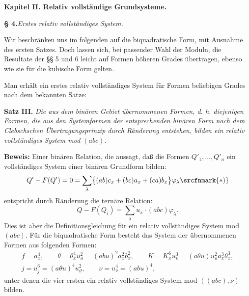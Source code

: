 \begin{center}
\textbf{Kapitel II. \quad Relativ vollständige Grundsysteme.}

\textbf{§ 4.}\quad\emph{Erstes relativ vollständiges System.}
\end{center}

Wir beschränken uns im folgenden auf die biquadratische Form, mit Ausnahme des ersten Satzes. Doch lassen sich, bei passender Wahl der Moduln, die Resultate der §§ 5 und 6 leicht auf Formen höheren Grades übertragen, ebenso wie sie für die kubische Form gelten.

Man erhält ein erstes relativ vollständiges System für Formen beliebigen Grades nach dem bekannten Satze:

\clearpage
\noindent\textbf{Satz III.}
\emph{Die aus dem binären Gebiet übernommenen Formen, d. h. diejenigen Formen, die aus den Systemformen der entsprechenden binären Form nach dem Clebschschen Übertragungsprinzip durch Ränderung entstehen, bilden ein relativ vollständiges System mod $(abc)$.}

\noindent\textbf{Beweis:}
Einer binären Relation, die aussagt, daß die Formen $Q'_1,\ldots,Q'_n$ ein vollständiges System einer binären Grundform bilden:
\[
Q'-F(Q')=0=\sum_\lambda\bigl\{(ab)c_x+(bc)a_x+(ca)b_x\bigr\}\varphi_\lambda\srcfnmark{*)}
\]
entspricht durch Ränderung die ternäre Relation:
\[
Q-F(Q_i)=\sum_\lambda u_x\cdot(abc)\varphi_\lambda .
\]
Dies ist aber die Definitionsgleichung für ein relativ vollständiges System mod $(abc)$. Für die biquadratische Form besteht das System der übernommenen Formen aus folgenden Formen:
\[
\begin{gathered}
f=a_x^4,\qquad
\theta=\theta_x^4u_\vartheta^2=(abu)^2a_x^2b_x^2,
\qquad
K=K_x^6u_k^3=(a\theta u)u_\vartheta^2a_x^3\theta_x^3,\\
j=u_j^6=(a\theta u)^4u_\vartheta^2,\qquad
\nu=u_\nu^4=(abu)^4,
\end{gathered}
\]
unter denen die vier ersten ein relativ vollständiges System mod $((abc),\nu)$ bilden.

